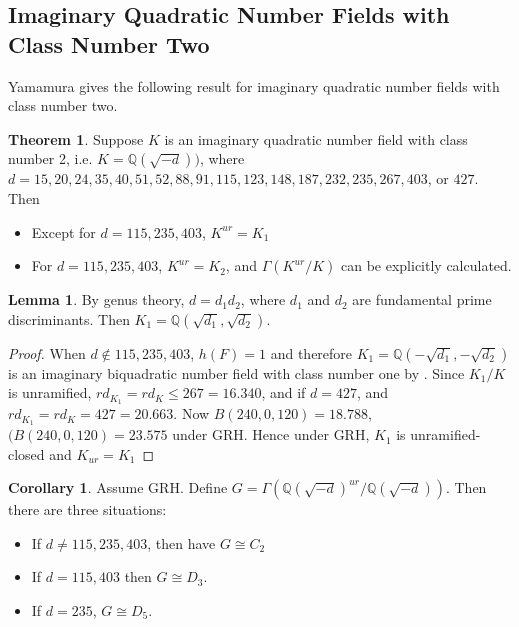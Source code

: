 \documentclass[12pt]{extarticle}
\newcommand{\Q}{\mathbb{Q}}
\newcommand{\<}{\langle}
\renewcommand{\>}{\rangle}
\theoremstyle{definition}
\newtheorem{theorem}{Theorem}
\newtheorem{corollary}{Corollary}
\newtheorem{lemma}{Lemma}
\begin{document}
\subsection{Imaginary Quadratic Number Fields with Class Number Two}
Yamamura \cite{YAMAMURA1996} gives the following result for imaginary quadratic number fields with class number two.
\begin{theorem}
Suppose $K$ is an imaginary quadratic number field with class number 2, i.e. $K=\Q(\sqrt{-d}))$, where $d= 15, 20, 24, 35, 40, 51, 52, 88, 91, 115, 123, 148, 187, 232, 235, 267, 403$, or $427$. Then \begin{itemize}
\item Except for $d = 115, 235, 403$, $K^{ur} = K_1$
\item For $d = 115, 235, 403$, $K^{ur} = K_2$, and $\Gamma(K^{ur}/K)$ can be explicitly calculated. 
\end{itemize}
\end{theorem}
\begin{lemma}
\label{lem:gen}
By genus theory, $d= d_1d_2$, where $d_1$ and $d_2$ are fundamental prime discriminants. Then $K_1 = \Q(\sqrt{d_1},\sqrt{d_2})$. 
\end{lemma}
\begin{proof}
When $d \not \in {115, 235, 403}$, $h(F)=1$ and therefore 
$K_1 =\Q \left(- \sqrt{d_1}, - \sqrt{d_2} \right)$ is an imaginary biquadratic number field with class number one by . Since $K_1/K$ is unramified, $rd_{K_1}=rd_K \leq 267=16.340$, and if $d = 427$, and $rd_{K_1}=rd_K = 427=20.663$. Now $B(240, 0, 120) = 18.788$, $(B(240, 0, 120) = 23.575$ under GRH. Hence under GRH, $K_1$ is unramified-closed and $K_{ur}=K_1$ 
\end{proof}
\begin{corollary}
Assume GRH. Define $G = \Gamma\left(\Q(\sqrt{-d})^{ur}/\Q(\sqrt{-d})\right)$. Then there are three situations:
\begin{itemize}
\item If $d \neq 115, 235, 403$, then have $ G \cong C_2$
\item If $d = 115,403$ then $G \cong D_3$.
\item If $d =  235$, $G \cong D_5$. 
\end{itemize}
\end{corollary}
\end{document}
